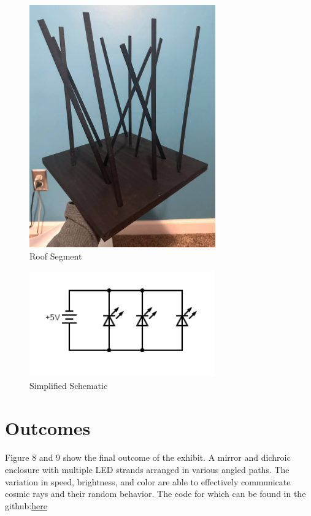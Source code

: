 \documentclass{article}
\begin{document}
\begin{figure}
    \centering
    \includegraphics[width=0.7143\textwidth]{sticks.jpg}
    \caption{Roof Segment}
\end{figure}

\begin{figure}
    \centering
    \includegraphics[width=0.7143\textwidth]{circuit.png}
    \caption{Simplified Schematic}
\end{figure}

\section{Outcomes}
\paragraph{}Figure 8 and 9 show the final outcome of the exhibit. A mirror and dichroic enclosure with multiple LED strands arranged in various angled paths. The variation in speed, brightness, and color are able to effectively communicate cosmic rays and their random behavior. The code for which can be found in the github:\href{https://github.com/EverettHagen/PHYS494}{here}
\end{document}
